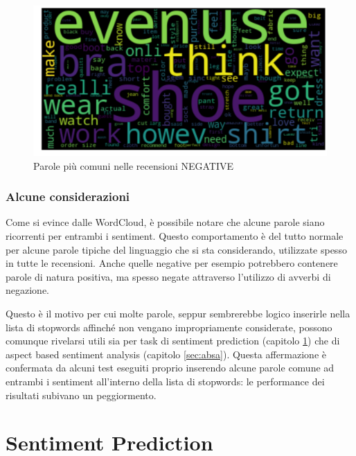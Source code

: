 \documentclass[hidelinks, 12pt]{article}
\begin{document}
\begin{figure}[H]
	\centering
	\includegraphics[scale=0.36]{images/04_03_wordcloud_neg.png}
	\caption[Parole più comuni nelle recensioni NEGATIVE]{Parole più comuni nelle recensioni NEGATIVE}
	\label{fig:wordcloud-neg}
\end{figure}


\subsubsection{Alcune considerazioni}

Come si evince dalle WordCloud, è possibile notare che alcune parole siano ricorrenti per entrambi i sentiment. Questo comportamento è del tutto normale per alcune parole tipiche del linguaggio che si sta considerando, utilizzate spesso in tutte le recensioni. Anche quelle negative per esempio potrebbero contenere parole di natura positiva, ma spesso negate attraverso l'utilizzo di avverbi di negazione.

Questo è il motivo per cui molte parole, seppur sembrerebbe logico inserirle nella lista di stopwords affinché non vengano impropriamente considerate, possono comunque rivelarsi utili sia per task di sentiment prediction (capitolo \ref{sec:sentiment-prediction}) che di aspect based sentiment analysis (capitolo \ref{sec:absa}). Questa affermazione è confermata da alcuni test eseguiti proprio inserendo alcune parole comune ad entrambi i sentiment all'interno della lista di stopwords: le performance dei risultati subivano un peggiormento.



\clearpage



\section{Sentiment Prediction}
\label{sec:sentiment-prediction}
\end{document}
